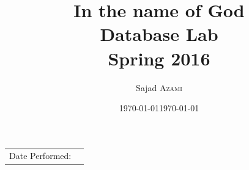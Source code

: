 \documentclass{article}
\title{In the name of God \\ Database Lab \\ Spring 2016} %
\author{Sajad \textsc{Azami}} %
\date{\today} %
\begin{document}
\maketitle %

\begin{center}
	\begin{tabular}{l r}
		Date Performed: & \date{\today} \\ %
	\end{tabular}
\end{center}


\end{document}
